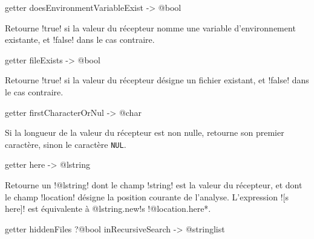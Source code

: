 
\begin{galgasbox}
getter doesEnvironmentVariableExist -> @bool
\end{galgasbox}

Retourne \ggs!true! si la valeur du récepteur nomme une variable d'environnement existante, et \ggs!false! dans le cas contraire.









\begin{galgasbox}
getter fileExists -> @bool
\end{galgasbox}

Retourne \ggs!true! si la valeur du récepteur désigne un fichier existant, et \ggs!false! dans le cas contraire.










\begin{galgasbox}
getter firstCharacterOrNul -> @char
\end{galgasbox}

Si la longueur de la valeur du récepteur est non nulle, retourne son premier caractère, sinon le caractère \texttt{NUL}.








\begin{galgasbox}
getter here -> @lstring
\end{galgasbox}

Retourne un \ggs!@lstring! dont le champ \ggs!string! est la valeur du récepteur, et dont le champ \ggs!location! désigne la position courante de l'analyse. L'expression \ggs![s here]! est équivalente à \ggs*@lstring.new{!s !@location.here}*.









\begin{galgasbox}
getter hiddenFiles ?@bool inRecursiveSearch -> @stringlist
\end{galgasbox}

